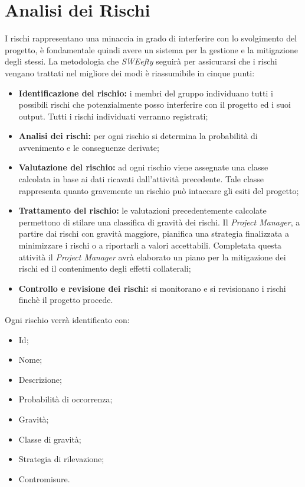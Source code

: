 \section{Analisi dei Rischi}
I rischi rappresentano una minaccia in grado di interferire con lo svolgimento del progetto, è fondamentale quindi avere un sistema per la gestione e la mitigazione degli stessi.
La metodologia che \textit{SWEefty} seguirà per assicurarsi che i rischi vengano trattati nel migliore dei modi è riassumibile in cinque punti:
\begin{itemize}
	\item \textbf{Identificazione del rischio:} i membri del gruppo individuano tutti i possibili rischi che potenzialmente posso interferire con il progetto ed i suoi output. Tutti i rischi individuati verranno registrati;
	
	\item \textbf{Analisi dei rischi:} per ogni rischio si determina la probabilità di avvenimento e le conseguenze derivate;
	
	\item \textbf{Valutazione del rischio:} ad ogni rischio viene assegnate una classe calcolata in base ai dati ricavati dall'attività precedente. Tale classe rappresenta quanto gravemente un rischio può intaccare gli esiti del progetto;
	
	\item \textbf{Trattamento del rischio:} le valutazioni precedentemente calcolate permettono di stilare una classifica di gravità dei rischi. Il \emph{Project Manager}, a partire dai rischi con gravità maggiore, pianifica una strategia finalizzata a minimizzare i rischi o a riportarli a valori accettabili. Completata questa attività il \emph{Project Manager} avrà elaborato un piano per la mitigazione dei rischi ed il contenimento degli effetti collaterali;
	
	\item \textbf{Controllo e revisione dei rischi:} si monitorano e si revisionano i rischi finchè il progetto procede.
\end{itemize}

Ogni rischio verrà identificato con:
\begin{itemize}
	\item Id;
	\item Nome;
	\item Descrizione;
	\item Probabilità di occorrenza;
	\item Gravità;
	\item Classe di gravità;
	\item Strategia di rilevazione;
	\item Contromisure.
\end{itemize}

